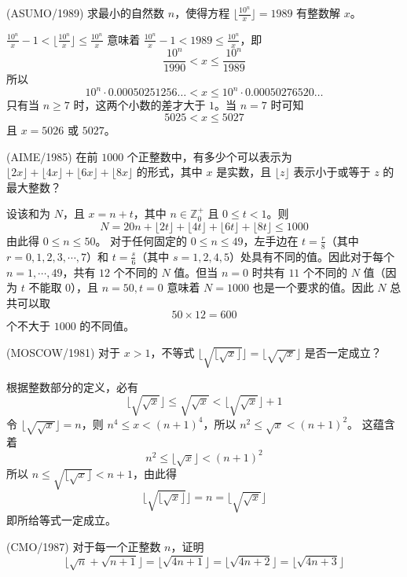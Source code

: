 \begin{questions}
\question (ASUMO/1989) 求最小的自然数 $n$，使得方程 $\lfloor \frac{10^n}{x} \rfloor = 1989$ 有整数解 $x$。

\begin{solution}
$\frac{10^n}{x} - 1 < \lfloor \frac{10^n}{x} \rfloor \le \frac{10^n}{x}$ 意味着 $\frac{10^n}{x} - 1 < 1989 \le \frac{10^n}{x}$，即
\[
\frac{10^n}{1990} < x \le \frac{10^n}{1989}
\]
所以
\[
10^n \cdot 0.00050251256\dots < x \le 10^n \cdot 0.00050276520\dots
\]
只有当 $n \ge 7$ 时，这两个小数的差才大于 $1$。当 $n = 7$ 时可知
\[
5025 < x \le 5027
\]
且 $x = 5026$ 或 $5027$。
\end{solution}

\question (AIME/1985) 在前 $1000$ 个正整数中，有多少个可以表示为 $\lfloor 2x \rfloor + \lfloor 4x \rfloor + \lfloor 6x \rfloor + \lfloor 8x \rfloor$ 的形式，其中 $x$ 是实数，且 $\lfloor z \rfloor$ 表示小于或等于 $z$ 的最大整数？

\begin{solution}
设该和为 $N$，且 $x = n + t$，其中 $n \in \mathbb{Z}_0^+$ 且 $0 \le t < 1$。则
\[
N = 20n + \lfloor 2t \rfloor + \lfloor 4t \rfloor + \lfloor 6t \rfloor + \lfloor 8t \rfloor \le 1000
\]
由此得 $0 \le n \le 50$。
对于任何固定的 $0 \le n \le 49$，左手边在 $t = \frac{r}{8}$（其中 $r = 0, 1, 2, 3, \cdots, 7$）和 $t = \frac{s}{6}$（其中 $s = 1, 2, 4, 5$）处具有不同的值。因此对于每个 $n = 1, \cdots, 49$，共有 $12$ 个不同的 $N$ 值。但当 $n = 0$ 时共有 $11$ 个不同的 $N$ 值（因为 $t$ 不能取 $0$），且 $n = 50, t = 0$ 意味着 $N = 1000$ 也是一个要求的值。因此 $N$ 总共可以取
\[
50 \times 12 = 600
\]
个不大于 $1000$ 的不同值。
\end{solution}

\question (MOSCOW/1981) 对于 $x > 1$，不等式 $\lfloor \sqrt{\lfloor \sqrt{x} \rfloor} \rfloor = \lfloor \sqrt{\sqrt{x}} \rfloor$ 是否一定成立？

\begin{solution}
根据整数部分的定义，必有
\[
\lfloor \sqrt{\sqrt{x}} \rfloor \le \sqrt{\sqrt{x}} < \lfloor \sqrt{\sqrt{x}} \rfloor + 1
\]
令 $\lfloor \sqrt{\sqrt{x}} \rfloor = n$，则 $n^4 \le x < (n + 1)^4$，所以 $n^2 \le \sqrt{x} < (n + 1)^2$。
这蕴含着
\[
n^2 \le \lfloor \sqrt{x} \rfloor < (n + 1)^2
\]
所以 $n \le \sqrt{\lfloor \sqrt{x} \rfloor} < n + 1$，由此得
\[
\lfloor \sqrt{\lfloor \sqrt{x} \rfloor} \rfloor = n = \lfloor \sqrt{\sqrt{x}} \rfloor
\]
即所给等式一定成立。
\end{solution}

\question (CMO/1987) 对于每一个正整数 $n$，证明
\[
\lfloor \sqrt{n} + \sqrt{n + 1} \rfloor = \lfloor \sqrt{4n + 1} \rfloor = \lfloor \sqrt{4n + 2} \rfloor = \lfloor \sqrt{4n + 3} \rfloor
\]


\end{questions}
